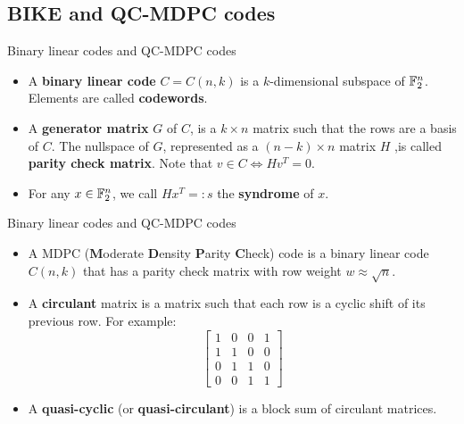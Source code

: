 \subsection{BIKE and QC-MDPC codes}

\begin{frame}{Binary linear codes and QC-MDPC codes}

\begin{itemize}
    \item A \textbf{binary linear code} $C = C(n,k)$ is a $k$-dimensional subspace of $\mathbb{F}_2^n$. Elements are called \textbf{codewords}.
\pause    \item A \textbf{generator matrix} $G$ of $C$, is a $k \times n$ matrix such that the rows are a basis of $C$. The nullspace of $G$, represented as a $(n-k)  \times n$ matrix $H$ ,is called \textbf{parity check matrix}. Note that $v \in C \iff Hv^T=0$.
\pause    \item For any $x \in \mathbb{F}_2^n$, we call $Hx^T =: s$ the \textbf{syndrome} of $x$.
    \end{itemize}

\end{frame}

\begin{frame}{Binary linear codes and QC-MDPC codes}

\begin{itemize}
    \item A MDPC (\textbf{M}oderate \textbf{D}ensity \textbf{P}arity \textbf{C}heck) code is a binary linear code $C(n,k)$ that has a parity check matrix with row weight $w \approx \sqrt{n}$.
\pause    \item A \textbf{circulant} matrix is a matrix such that each row is a cyclic shift of its previous row. For example:
    \[
    \begin{bmatrix}
    1 & 0 & 0 & 1 \\
    1 & 1 & 0 & 0 \\
    0 & 1 & 1 & 0 \\
    0 & 0 & 1 & 1
    \end{bmatrix}
    \]
\pause    \item A \textbf{quasi-cyclic} (or \textbf{quasi-circulant}) is a block sum of circulant matrices.
\end{itemize}
    
\end{frame}


